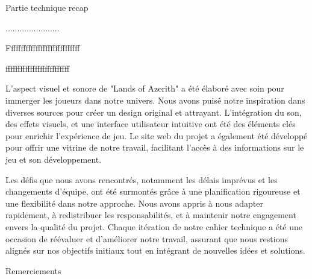  

Partie technique recap 

....................... 

 

 

 

 

 

Fffffffffffffffffffffffffffff 

 

 

 

 

 

 

 

 

 

 

 

 

 

 

 

 

ffffffffffffffffffffffffff 

  

L'aspect visuel et sonore de "Lands of Azerith" a été élaboré avec soin pour immerger les joueurs dans notre univers. Nous avons puisé notre inspiration dans diverses sources pour créer un design original et attrayant. L'intégration du son, des effets visuels, et une interface utilisateur intuitive ont été des éléments clés pour enrichir l'expérience de jeu. Le site web du projet a également été développé pour offrir une vitrine de notre travail, facilitant l'accès à des informations sur le jeu et son développement. 

  

Les défis que nous avons rencontrés, notamment les délais imprévus et les changements d'équipe, ont été surmontés grâce à une planification rigoureuse et une flexibilité dans notre approche. Nous avons appris à nous adapter rapidement, à redistribuer les responsabilités, et à maintenir notre engagement envers la qualité du projet. Chaque itération de notre cahier technique a été une occasion de réévaluer et d'améliorer notre travail, assurant que nous restions alignés sur nos objectifs initiaux tout en intégrant de nouvelles idées et solutions. 

  

 

 

 Remerciements 

